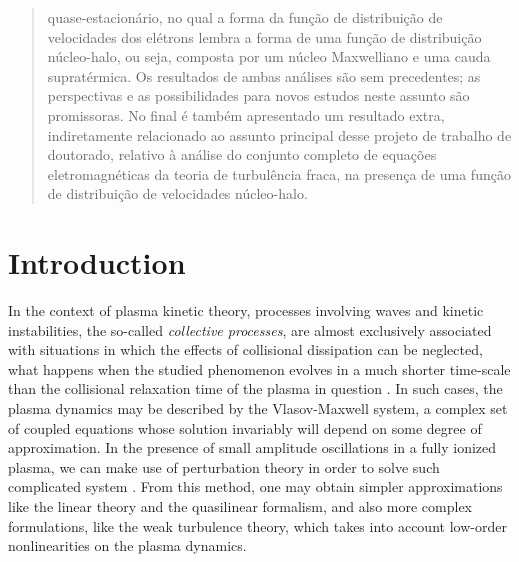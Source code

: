 \documentclass[12pt,a4paper,ruledheader]{report}
\begin{document}
\begin{otherlanguage}{brazilian}
\begin{abstract}
    quase-estacionário, no qual a forma da função de distribuição de velocidades
    dos elétrons lembra a forma de uma função de distribuição núcleo-halo, ou
    seja, composta por um núcleo Maxwelliano e uma cauda supratérmica. Os
    resultados de ambas análises são sem precedentes; as perspectivas e as
    possibilidades para novos estudos neste assunto são promissoras. No final é
    também apresentado um resultado extra, indiretamente relacionado ao assunto
    principal desse projeto de trabalho de doutorado, relativo à análise do
    conjunto completo de equações eletromagnéticas da teoria de turbulência
    fraca, na presença de uma função de distribuição de velocidades núcleo-halo. 
   \end{abstract}
\end{otherlanguage}
% 
\tableofcontents{\thispagestyle{empty}}
\listoffigures{\thispagestyle{empty}}
\pagestyle{fancy}
\fancyhf{}
\renewcommand{\headrulewidth}{0.5pt}
\lhead{\nouppercase{\it \leftmark}}
\rhead{\thepage}
\setcounter{page}{0}
\chapter{Introduction}
\label{cha:intro}

In the context of plasma kinetic theory, processes involving waves
and kinetic instabilities, the so-called \emph{collective processes},
are almost exclusively associated with situations in which the effects
of collisional dissipation can be neglected, what happens when the
studied phenomenon evolves in a much shorter time-scale than the
collisional relaxation time of the plasma in question \cite{akhi1967}.
In such cases, the plasma dynamics may be described by the Vlasov-Maxwell
system, a complex set of coupled equations whose
solution invariably will
depend on some degree of approximation. In the presence of small
amplitude oscillations in a fully ionized plasma, we can make use
of perturbation theory in order to solve such complicated system
\cite{klimo}. From this method, one may obtain simpler approximations
like the linear theory and the quasilinear formalism, and also
more complex formulations, like the weak turbulence theory, which
takes into account low-order nonlinearities on the plasma dynamics.
\end{document}
